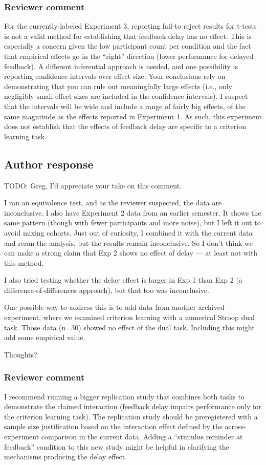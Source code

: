 \documentclass[12pt]{article}
\begin{document}
\subsubsection{Reviewer comment}
For the currently-labeled Experiment 3, reporting
fail-to-reject results for t-tests is not a valid method for
establishing that feedback delay has no effect. This is
especially a concern given the low participant count per
condition and the fact that empirical effects go in the
``right'' direction (lower performance for delayed feedback).
A different inferential approach is needed, and one
possibility is reporting confidence intervals over effect
size. Your conclusions rely on demonstrating that you can
rule out meaningfully large effects (i.e., only negligibly
small effect sizes are included in the confidence
intervals). I suspect that the intervals will be wide and
include a range of fairly big effects, of the same magnitude
as the effects reported in Experiment 1. As such, this
experiment does not establish that the effects of feedback
delay are specific to a criterion learning task.

\subsection{Author response}
TODO: Greg, I'd appreciate your take on this comment.

I ran an equivalence test, and as the reviewer suspected,
the data are inconclusive. I also have Experiment 2 data
from an earlier semester. It shows the same pattern (though
with fewer participants and more noise), but I left it out
to avoid mixing cohorts. Just out of curiosity, I combined
it with the current data and reran the analysis, but the
results remain inconclusive. So I don’t think we can make a
strong claim that Exp 2 shows no effect of delay --- at
least not with this method.

I also tried testing whether the delay effect is larger in
Exp 1 than Exp 2 (a difference-of-differences approach), but
that too was inconclusive.

One possible way to address this is to add data from another
archived experiment, where we examined criterion learning
with a numerical Stroop dual task. Those data (n=30) showed
no effect of the dual task. Including this might add some
empirical value.

Thoughts?

\subsubsection{Reviewer comment}
I recommend running a bigger replication study that combines
both tasks to demonstrate the claimed interaction (feedback
delay impairs performance only for the criterion learning
task). The replication study should be preregistered with a
sample size justification based on the interaction effect
defined by the across-experiment comparison in the current
data. Adding a ``stimulus reminder at feedback'' condition
to this new study might be helpful in clarifying the
mechanisms producing the delay effect.
\end{document}
